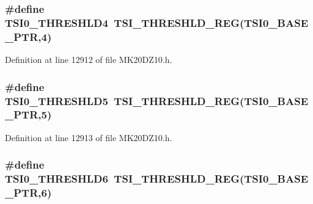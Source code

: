 \subsubsection[{\texorpdfstring{T\+S\+I0\+\_\+\+T\+H\+R\+E\+S\+H\+L\+D4}{TSI0_THRESHLD4}}]{\setlength{\rightskip}{0pt plus 5cm}\#define T\+S\+I0\+\_\+\+T\+H\+R\+E\+S\+H\+L\+D4~{\bf T\+S\+I\+\_\+\+T\+H\+R\+E\+S\+H\+L\+D\+\_\+\+R\+EG}({\bf T\+S\+I0\+\_\+\+B\+A\+S\+E\+\_\+\+P\+TR},4)}\hypertarget{group___t_s_i___register___accessor___macros_ga9cd5f54554780474d43b83aa594886ca}{}\label{group___t_s_i___register___accessor___macros_ga9cd5f54554780474d43b83aa594886ca}


Definition at line 12912 of file M\+K20\+D\+Z10.\+h.

\subsubsection[{\texorpdfstring{T\+S\+I0\+\_\+\+T\+H\+R\+E\+S\+H\+L\+D5}{TSI0_THRESHLD5}}]{\setlength{\rightskip}{0pt plus 5cm}\#define T\+S\+I0\+\_\+\+T\+H\+R\+E\+S\+H\+L\+D5~{\bf T\+S\+I\+\_\+\+T\+H\+R\+E\+S\+H\+L\+D\+\_\+\+R\+EG}({\bf T\+S\+I0\+\_\+\+B\+A\+S\+E\+\_\+\+P\+TR},5)}\hypertarget{group___t_s_i___register___accessor___macros_gae7e89d28c58a09c76b44eca46d3777fd}{}\label{group___t_s_i___register___accessor___macros_gae7e89d28c58a09c76b44eca46d3777fd}


Definition at line 12913 of file M\+K20\+D\+Z10.\+h.

\subsubsection[{\texorpdfstring{T\+S\+I0\+\_\+\+T\+H\+R\+E\+S\+H\+L\+D6}{TSI0_THRESHLD6}}]{\setlength{\rightskip}{0pt plus 5cm}\#define T\+S\+I0\+\_\+\+T\+H\+R\+E\+S\+H\+L\+D6~{\bf T\+S\+I\+\_\+\+T\+H\+R\+E\+S\+H\+L\+D\+\_\+\+R\+EG}({\bf T\+S\+I0\+\_\+\+B\+A\+S\+E\+\_\+\+P\+TR},6)}\hypertarget{group___t_s_i___register___accessor___macros_gae7d4c015341995740ba999d356c2ce90}{}\label{group___t_s_i___register___accessor___macros_gae7d4c015341995740ba999d356c2ce90}


